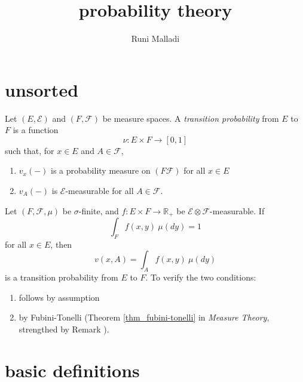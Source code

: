 \documentclass[12pt]{article}
\title{probability theory}
\author{Runi Malladi}
\begin{document}
\maketitle

\section{unsorted} %

\begin{definition}
	Let $(E,\mathcal{E})$ and $(F,\mathcal{F})$ be measure spaces. A \emph{transition probability} from $E$ to $F$ is a function 
	\begin{equation*}
		\nu: E\times F \to [0,1]
	\end{equation*}
	such that, for $x\in E$ and $A\in\mathcal{F}$, 
	\begin{enumerate}
		\item $v_x(-)$ is a probability measure on $(F\mathcal{F})$ for all $x\in E$
		\item $v_A(-)$ is $\mathcal{E}$-measurable for all $A\in\mathcal{F}$.
	\end{enumerate}
\end{definition}

\begin{example}
	Let $(F,\mathcal{F},\mu)$ be $\sigma$-finite, and $f:E\times F\to\mathbb{R}_+$ be $\mathcal{E}\otimes\mathcal{F}$-measurable. If 
	\begin{equation*}
		\int_F f(x,y)\ \mu(dy) = 1
	\end{equation*}
	for all $x\in E$, then 
	\begin{equation*}
		v(x,A) = \int_A f(x,y)\ \mu(dy)
	\end{equation*}
	is a transition probability from $E$ to $F$. To verify the two conditions: 
	\begin{enumerate}
		\item follows by assumption
		\item by Fubini-Tonelli (Theorem \ref{thm_fubini-tonelli} in \textit{Measure Theory}, strengthed by Remark ).
	\end{enumerate}
\end{example}




\section{basic definitions} %
\end{document}
